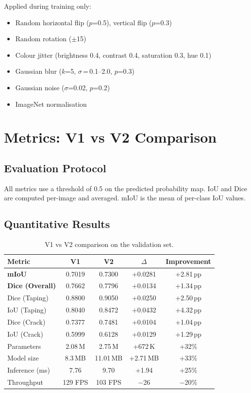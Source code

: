 \documentclass[12pt,a4paper]{article}
\begin{document}
Applied during training only:

\begin{itemize}[nosep]
  \item Random horizontal flip ($p$=0.5), vertical flip ($p$=0.3)
  \item Random rotation ($\pm$15\textdegree)
  \item Colour jitter (brightness 0.4, contrast 0.4, saturation 0.3, hue 0.1)
  \item Gaussian blur ($k$=5, $\sigma$\,=\,0.1--2.0, $p$=0.3)
  \item Gaussian noise ($\sigma$=0.02, $p$=0.2)
  \item ImageNet normalisation
\end{itemize}

\section{Metrics: V1 vs V2 Comparison}

\subsection{Evaluation Protocol}

All metrics use a threshold of 0.5 on the predicted probability map.  IoU and Dice are computed per-image and averaged.  mIoU is the mean of per-class IoU values.

\subsection{Quantitative Results}

\begin{table}[H]
\centering
\caption{V1 vs V2 comparison on the validation set.}
\label{tab:v1v2}
\begin{tabular}{lcccc}
\toprule
\textbf{Metric} & \textbf{V1} & \textbf{V2} & \textbf{$\Delta$} & \textbf{Improvement} \\
\midrule
\textbf{mIoU}          & 0.7019 & 0.7300 & +0.0281 & +2.81\,pp \\
\textbf{Dice (Overall)} & 0.7662 & 0.7796 & +0.0134 & +1.34\,pp \\
\midrule
Dice (Taping)  & 0.8800 & 0.9050 & +0.0250 & +2.50\,pp \\
IoU (Taping)   & 0.8040 & 0.8472 & +0.0432 & +4.32\,pp \\
Dice (Crack)   & 0.7377 & 0.7481 & +0.0104 & +1.04\,pp \\
IoU (Crack)    & 0.5999 & 0.6128 & +0.0129 & +1.29\,pp \\
\midrule
Parameters     & 2.08\,M & 2.75\,M & +672\,K & +32\% \\
Model size     & 8.3\,MB & 11.01\,MB & +2.71\,MB & +33\% \\
Inference (ms) & 7.76  & 9.70  & +1.94  & +25\% \\
Throughput     & 129 FPS & 103 FPS & $-$26 & $-$20\% \\
\bottomrule
\end{tabular}
\end{table}
\end{document}
